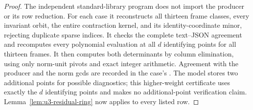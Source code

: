 \begin{proof}
The independent standard-library program
 does not import the producer or its
row reduction. For each case it reconstructs all thirteen frame
classes, every invariant orbit, the entire contraction kernel,
and its identity-coordinate minor, rejecting duplicate sparse
indices. It checks the complete text--JSON agreement and
recomputes every polynomial evaluation at all $d$ identifying
points for all thirteen frames. It then computes both determinants
by column elimination, using only norm-unit pivots and exact
integer arithmetic. Agreement with the producer and the norm
gcds are recorded in the case's .
The model stores two additional points for possible diagnostics;
this higher-weight certificate uses exactly the $d$ identifying
points and makes no additional-point verification claim.
Lemma~\ref{lem:u3-residual-ring} now applies to every listed row.
\end{proof}
